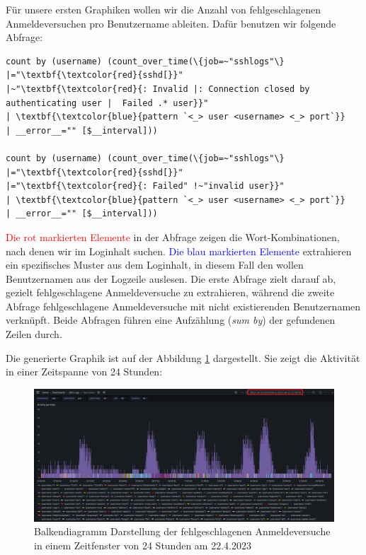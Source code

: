 Für unsere ersten Graphiken wollen wir die Anzahl von fehlgeschlagenen Anmeldeversuchen pro Benutzername ableiten. Dafür benutzen wir folgende Abfrage:

{
\begin{Verbatim}[fontsize=\small,commandchars=\\\{\},frame=single]
count by (username) (count_over_time(\{job=~"sshlogs"\} 
|="\textbf{\textcolor{red}{sshd[}}"
|~"\textbf{\textcolor{red}{: Invalid |: Connection closed by authenticating user |  Failed .* user}}"
| \textbf{\textcolor{blue}{pattern `<_> user <username> <_> port`}}
| __error__="" [$__interval]))

count by (username) (count_over_time(\{job=~"sshlogs"\}
|="\textbf{\textcolor{red}{sshd[}}"
|="\textbf{\textcolor{red}{: Failed" !~"invalid user}}"
| \textbf{\textcolor{blue}{pattern `<_> user <username> <_> port`}}
| __error__="" [$__interval]))
\end{Verbatim}
}

\textcolor{red}{Die rot markierten Elemente} in der Abfrage zeigen die Wort-Kombinationen, nach denen wir im Loginhalt suchen. \textcolor{blue}{Die blau markierten Elemente} extrahieren ein spezifisches Muster aus dem Loginhalt, in diesem Fall den wollen Benutzernamen aus der Logzeile auslesen. Die erste Abfrage zielt darauf ab, gezielt fehlgeschlagene Anmeldeversuche zu extrahieren, während die zweite Abfrage fehlgeschlagene Anmeldeversuche mit nicht existierenden Benutzernamen verknüpft. Beide Abfragen führen eine Aufzählung (\textit{sum by}) der gefundenen Zeilen durch.

Die generierte Graphik ist auf der Abbildung \ref{fig:2_Anmeldung_BenutzerName} dargestellt. Sie zeigt die Aktivität in einer Zeitspanne von 24 Stunden:

\newpage
{}
\thispagestyle{lscape}
\begin{landscape}
    \begin{figure}[H]
        \centerline{\includegraphics[width=1.5\textwidth]{assets/activityperhour.png}}
        \caption[Balkendiagramm Darstellung der fehlgeschlagenen Anmeldeversuche in einem Zeitfenster von 24 Stunden am ]
        {Balkendiagramm Darstellung der fehlgeschlagenen Anmeldeversuche in einem Zeitfenster von 24 Stunden am 22.4.2023}
        \label{fig:2_Anmeldung_BenutzerName}
        \centering
    \end{figure}
\end{landscape}
\restoregeometry

